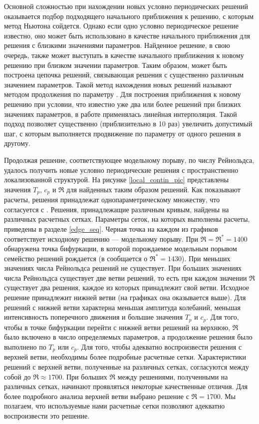 Основной сложностью при нахождении новых условно периодических решений оказывается подбор подходящего начального приближения к решению, с которым метод Ньютона сойдется. Однако если одно условно периодическое решение известно, оно может быть использовано в качестве начального приближения для решения с близкими значениями параметров. Найденное решение, в свою очередь, также может выступать в качестве начального приближения к новому решению при близком значении параметров. Таким образом, может быть построена цепочка решений, связывающая решения с существенно различным значением параметров. Такой метод нахождения новых решений называют методом продолжения по параметру \cite{Viswanath2007, Dijkstra2014}. Для построения приближения к новому решению при условии, что известно уже два или более решений при близких значениях параметров, в работе применялась линейная интерполяция. Такой подход позволяет существенно (приблизительно в 10 раз) увеличить допустимый шаг, с которым выполняется продвижение по параметру от одного решения в другому. 

Продолжая решение, соответствующее модельному порыву, по числу Рейнольдса, удалось получить новые условно периодические решения с пространственно локализованной структурой. На рисунке \ref{local_contin_pic} представлены значения $T_p$, $c_p$ и $\Re$ для найденных таким образом решений. Как показывают расчеты, решения принадлежат однопараметрическому множеству, что согласуется с \cite{Avila2013}. Решения, принадлежащие различным кривым, найдены на различных расчетных сетках. Параметры сеток, на которых выполнены расчеты, приведены в разделе \ref{edge_seq}. Черная точка на каждом из графиков соответствует исходному решению --- модельному порыву. При $\Re = \Re^* = 1400$ обнаружена точка бифуркации, в которой порождаемое модельным порывом семейство решений рождается (в \cite{Avila2013} сообщается о $\Re^* = 1430$). При меньших значениях числа Рейнольдса решений не существует. При больших значениях числа Рейнольдса существует две ветви решений, то есть при каждом значении $\Re$ существует два решения, каждое из которых принадлежит свой ветви. Исходное решение принадлежит нижней ветви (на графиках она оказывается выше). Для решений с нижней ветви характерна меньшая амплитуда колебаний, меньшая интенсивность поперечного движения и большие значения $T_p$ и $c_p$. Для того, чтобы в точке бифуркации перейти с нижней ветви решений на верхнюю, $\Re$ было включено в число определяемых параметров, а продолжение решения было выполнено по $T_p$ или $c_p$. Для того, чтобы адекватно воспроизвести решения с верхней ветви, необходимы более подробные расчетные сетки. Характеристики решений с верхней ветви, полученные на различных сетках, согласуются между собой до $\Re \approx 1700$. При больших $\Re$ между решениями, полученными на различных сетках, начинают проявляться некоторые качественные отличия. Для более подробного анализа верхней ветви выбрано решение с $\Re = 1700$. Мы полагаем, что используемые нами расчетные сетки позволяют адекватно воспроизвести это решение. 



